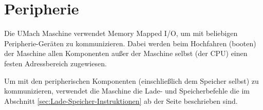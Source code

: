 \section{Peripherie}

Die UMach Maschine verwendet \glqq Memory Mapped I/O\grqq, um mit beliebigen
Peripherie-Geräten zu kommunizieren.
Dabei werden beim Hochfahren (\glqq booten\grqq) der Maschine allen Komponenten
außer der Maschine selbst (der CPU) einen festen Adressbereich zugewiesen.

Um mit den peripherischen Komponenten (einschließlich dem Speicher selbst) zu
kommunizieren, verwendet die Maschine die Lade- und Speicherbefehle die im
Abschnitt 
\ref{sec:Lade-Speicher-Instruktionen}
ab der Seite
\pageref{sec:Lade-Speicher-Instruktionen}
beschrieben sind.











